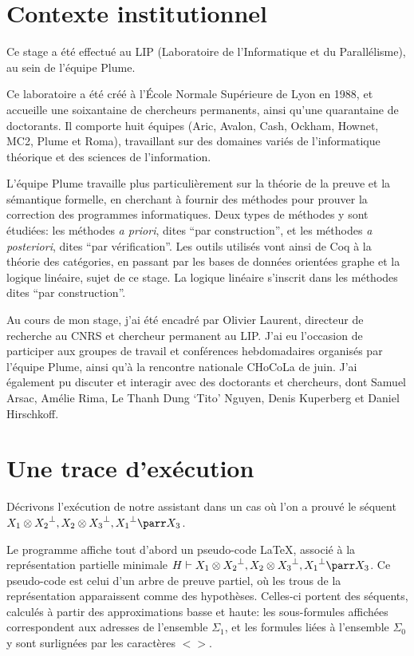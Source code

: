\documentclass[11pt,a4paper]{article}
\theoremstyle{plain}
\theoremstyle{definition}
\theoremstyle{remark}
\newcommand*{\orth}{^\perp}
\newcommand*{\tensor}{\otimes}
\newcommand*{\unknown}{H}
\newcommand*{\lowapprox}{\ensuremath{\Sigma_0}}
\newcommand*{\highapprox}{\ensuremath{\Sigma_1}}
\begin{document}
\printbibliography



\clearpage

\appendix

\section{Contexte institutionnel}
\label{inst_contex}
Ce stage a été effectué au LIP (Laboratoire de l'Informatique et du Parallélisme), au sein de l'équipe Plume. 

Ce laboratoire a été créé à l’École Normale Supérieure de Lyon en 1988, et accueille une soixantaine de chercheurs permanents, ainsi qu'une quarantaine de doctorants. Il comporte huit équipes (Aric, Avalon, Cash, Ockham, Hownet, MC2, Plume et Roma), travaillant sur des domaines variés de l'informatique théorique et des sciences de l'information. 

L'équipe Plume travaille plus particulièrement sur la théorie de la preuve et la sémantique formelle, en cherchant à fournir des méthodes pour prouver la correction des programmes informatiques. Deux types de méthodes y sont étudiées: les méthodes \textit{a priori}, dites ``par construction'', et les méthodes \textit{a posteriori}, dites ``par vérification''. Les outils utilisés vont ainsi de Coq à la théorie des catégories, en passant par les bases de données orientées graphe et la logique linéaire, sujet de ce stage. La logique linéaire s'inscrit dans les méthodes dites ``par construction''.

Au cours de mon stage, j'ai été encadré par Olivier Laurent, directeur de recherche au CNRS et chercheur permanent au LIP. J'ai eu l'occasion de participer aux groupes de travail et conférences hebdomadaires organisés par l'équipe Plume, ainsi qu'à la rencontre nationale CHoCoLa de juin. J'ai également pu discuter et interagir avec des doctorants et chercheurs, dont Samuel Arsac, Amélie Rima, Le Thanh Dung ‘Tito’ Nguyen, Denis Kuperberg et Daniel Hirschkoff.

\section{Une trace d'exécution}
\label{exec_trace}
Décrivons l'exécution de notre assistant dans un cas où l'on a prouvé le séquent $X_1 \tensor {X_2}\orth, X_2 \tensor {X_3}\orth, {X_1}\orth \parr X_3$.

Le programme affiche tout d'abord un pseudo-code \LaTeX{}, associé à la représentation partielle minimale $\unknown \vdash X_1 \tensor {X_2}\orth, X_2 \tensor {X_3}\orth, {X_1}\orth \parr X_3$. Ce pseudo-code est celui d'un arbre de preuve partiel, où les trous de la représentation apparaissent comme des hypothèses. Celles-ci portent des séquents, calculés à partir des approximations basse et haute: les sous-formules affichées correspondent aux adresses de l'ensemble $\highapprox$, et les formules liées à l'ensemble $\lowapprox$ y sont surlignées par les caractères $<>$. 
\end{document}
